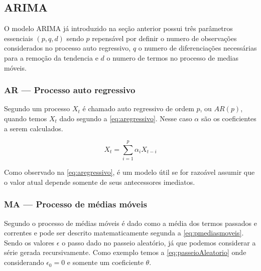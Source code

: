 \documentclass[
    12pt,
    oneside,
    a4paper,
    english,
    brazil
]{abntex2}
\begin{document}

\subsection{ARIMA}

O  modelo  ARIMA  já  introduzido  na seção  anterior  possui  três  parâmetros
essenciais $(p,q,d)$ sendo  $p$ repensável por definir o  numero de observações
considerados  no  processo auto  regressivo,  $q$  o numero  de  diferenciações
necessárias para a remoção da tendencia e $d$ o numero de termos no processo de
medias móveis.

\subsubsection{AR --- Processo auto regressivo}


Segundo    um  processo  $X_t$  é  chamado  auto  regressivo
de   ordem   $p$,   ou   $AR(p)$,   quando   temos   $X_t$   dado   segundo   a
\autoref{eq:aregressivo}.  Nesse  caso $\alpha$  são  os  coeficientes a  serem
calculados.

\begin{equation}
    \label{eq:aregressivo}
    X_t = \sum_{i = 1}^{p}{\alpha_{i}X_{t-i}}
\end{equation}

Como observado  na \autoref{eq:aregressivo}, é  um modelo útil se  for razoável
assumir que o valor atual depende somente de seus antecessores imediatos.

\subsubsection{MA --- Processo de médias móveis}


Segundo  o processo de  médias móveis é dado como
a média  dos termos passados  e correntes  e pode ser  descrito matematicamente
segunda a \autoref{eq:pmediasmoveis}. Sendo os  valores $\epsilon$ o passo dado
no passeio aleatório, já que  podemos considerar a série gerada recursivamente.
Como   exemplo   temos   a  \autoref{eq:passeioAleatorio}   onde   considerando
$\epsilon_0 = 0$ e somente um coeficiente $\theta$.
\end{document}
